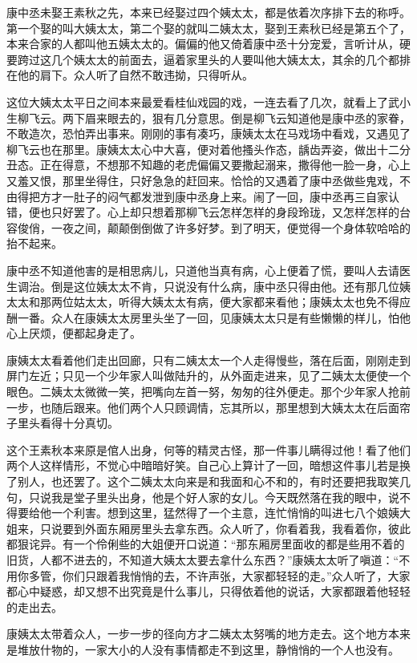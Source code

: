 \documentclass[12pt,UTF8]{ctexbook}
\begin{document}
{{{康中丞未娶王素秋之先，本来已经娶过四个姨太太，都是依着次序排下去的称呼。第一个娶的叫大姨太太，第二个娶的就叫二姨太太，娶到王素秋已经是第五个了，本来合家的人都叫他五姨太太的。偏偏的他又倚着康中丞十分宠爱，言听计从，硬要跨过这几个姨太太的前面去，逼着家里头的人要叫他大姨太太，其余的几个都排在他的肩下。众人听了自然不敢违拗，只得听从。

这位大姨太太平日之间本来最爱看桂仙戏园的戏，一连去看了几次，就看上了武小生柳飞云。两下眉来眼去的，狠有几分意思。倒是柳飞云知道他是康中丞的家眷，不敢造次，恐怕弄出事来。刚刚的事有凑巧，康姨太太在马戏场中看戏，又遇见了柳飞云也在那里。康姨太太心中大喜，便对着他搔头作态，龋齿弄姿，做出十二分丑态。正在得意，不想那不知趣的老虎偏偏又要撒起溺来，撒得他一脸一身，心上又羞又恨，那里坐得住，只好急急的赶回来。恰恰的又遇着了康中丞做些鬼戏，不由得把方才一肚子的闷气都发泄到康中丞身上来。闹了一回，康中丞再三自家认错，便也只好罢了。心上却只想着那柳飞云怎样怎样的身段玲珑，又怎样怎样的台容俊俏，一夜之间，颠颠倒倒做了许多好梦。到了明天，便觉得一个身体软哈哈的抬不起来。

康中丞不知道他害的是相思病儿，只道他当真有病，心上便着了慌，要叫人去请医生调治。倒是这位姨太太不肯，只说没有什么病，康中丞只得由他。还有那几位姨太太和那两位姑太太，听得大姨太太有病，便大家都来看他；康姨太太也免不得应酬一番。众人在康姨太太房里头坐了一回，见康姨太太只是有些懒懒的样儿，怕他心上厌烦，便都起身走了。

康姨太太看着他们走出回廊，只有二姨太太一个人走得慢些，落在后面，刚刚走到屏门左近；只见一个少年家人叫做陆升的，从外面走进来，见了二姨太太便使一个眼色。二姨太太微微一笑，把嘴向左首一努，匆匆的往外便走。那个少年家人抢前一步，也随后跟来。他们两个人只顾调情，忘其所以，那里想到大姨太太在后面帘子里头看得十分真切。

这个王素秋本来原是倌人出身，何等的精灵古怪，那一件事儿瞒得过他！看了他们两个人这样情形，不觉心中暗暗好笑。自己心上算计了一回，暗想这件事儿若是换了别人，也还罢了。这个二姨太太向来是和我面和心不和的，有时还要把我取笑几句，只说我是堂子里头出身，他是个好人家的女儿。今天既然落在我的眼中，说不得要给他一个利害。想到这里，猛然得了一个主意，连忙悄悄的叫进七八个娘姨大姐来，只说要到外面东厢房里头去拿东西。众人听了，你看着我，我看着你，彼此都狠诧异。有一个伶俐些的大姐便开口说道：“那东厢房里面收的都是些用不着的旧货，人都不进去的，不知道大姨太太要去拿什么东西？”康姨太太听了嗔道：“不用你多管，你们只跟着我悄悄的去，不许声张，大家都轻轻的走。”众人听了，大家都心中疑惑，却又想不出究竟是什么事儿，只得依着他的说话，大家都跟着他轻轻的走出去。

康姨太太带着众人，一步一步的径向方才二姨太太努嘴的地方走去。这个地方本来是堆放什物的，一家大小的人没有事情都走不到这里，静悄悄的一个人也没有。

}}}
\end{document}
